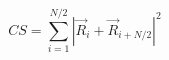 \documentclass[12pt]{article}
\begin{document}
$$
   CS = \sum_{i = 1}^{N/2} | \vec{R}_i + \vec{R}_{i+N/2} |^2
$$
\end{document}

